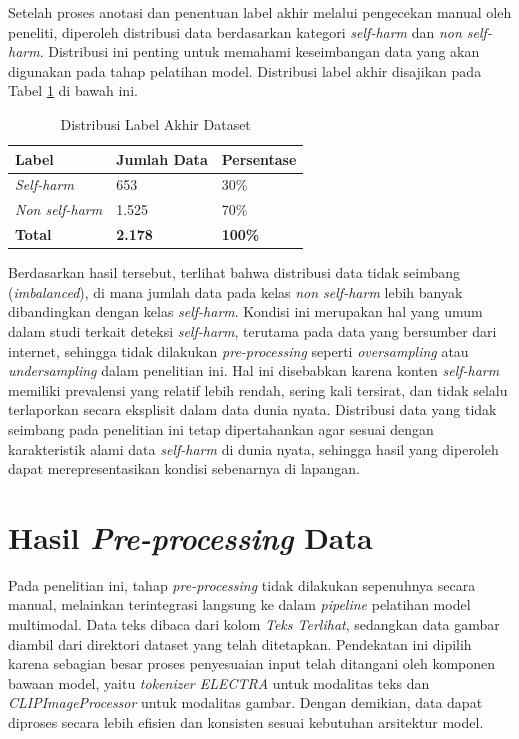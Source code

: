 Setelah proses anotasi dan penentuan label akhir melalui pengecekan manual oleh peneliti, diperoleh distribusi data berdasarkan kategori \textit{self-harm} dan \textit{non self-harm}. Distribusi ini penting untuk memahami keseimbangan data yang akan digunakan pada tahap pelatihan model. Distribusi label akhir disajikan pada Tabel \ref{table:4.distribusi_label} di bawah ini.

\begin{table}[H]
    \centering
    \caption{Distribusi Label Akhir Dataset}
    \label{table:4.distribusi_label}
    \small
    \setlength{\tabcolsep}{3pt}
    \renewcommand{\arraystretch}{1.1}
    \begin{tabular}{p{2.5cm} p{2.5cm} p{2cm}}
        \hline
        \textbf{Label} & \textbf{Jumlah Data} & \textbf{Persentase} \\
        \hline
        \textit{Self-harm} & 653 & 30\% \\
        \textit{Non self-harm} & 1.525 & 70\% \\
        \textbf{Total} & \textbf{2.178} & \textbf{100\%} \\
        \hline
    \end{tabular}
\end{table}

Berdasarkan hasil tersebut, terlihat bahwa distribusi data tidak seimbang (\textit{imbalanced}), di mana jumlah data pada kelas \textit{non self-harm} lebih banyak dibandingkan dengan kelas \textit{self-harm}. Kondisi ini merupakan hal yang umum dalam studi terkait deteksi \textit{self-harm}, terutama pada data yang bersumber dari internet, sehingga tidak dilakukan \textit{pre-processing} seperti \textit{oversampling} atau \textit{undersampling} dalam penelitian ini. Hal ini disebabkan karena konten \textit{self-harm} memiliki prevalensi yang relatif lebih rendah, sering kali tersirat, dan tidak selalu terlaporkan secara eksplisit dalam data dunia nyata. Distribusi data yang tidak seimbang pada penelitian ini tetap dipertahankan agar sesuai dengan karakteristik alami data \textit{self-harm} di dunia nyata, sehingga hasil yang diperoleh dapat merepresentasikan kondisi sebenarnya di lapangan.

\section{Hasil \textit{Pre-processing} Data} \label{IV.Preprocessing}
Pada penelitian ini, tahap \textit{pre-processing} tidak dilakukan sepenuhnya secara manual, melainkan terintegrasi langsung ke dalam \textit{pipeline} pelatihan model multimodal. Data teks dibaca dari kolom \textit{Teks Terlihat}, sedangkan data gambar diambil dari direktori dataset yang telah ditetapkan. Pendekatan ini dipilih karena sebagian besar proses penyesuaian input telah ditangani oleh komponen bawaan model, yaitu \textit{tokenizer ELECTRA} untuk modalitas teks dan \textit{CLIPImageProcessor} untuk modalitas gambar. Dengan demikian, data dapat diproses secara lebih efisien dan konsisten sesuai kebutuhan arsitektur model.

